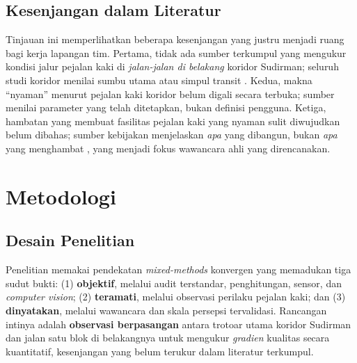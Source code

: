 \documentclass[11pt,a4paper]{report}
\begin{document}
\section{Kesenjangan dalam Literatur}
Tinjauan ini memperlihatkan beberapa kesenjangan yang justru menjadi ruang bagi kerja lapangan
tim. Pertama, tidak ada sumber terkumpul yang mengukur kondisi jalur pejalan kaki di
\emph{jalan-jalan di belakang} koridor Sudirman; seluruh studi koridor menilai sumbu utama atau
simpul transit \autocite{dwisadana2024,rakhmatulloh2020,ridhani2015,mulyadi2022}.
Kedua, makna ``nyaman'' menurut pejalan kaki koridor belum digali secara terbuka; sumber menilai
parameter yang telah ditetapkan, bukan definisi pengguna.
Ketiga, hambatan yang membuat fasilitas pejalan kaki yang nyaman sulit diwujudkan belum dibahas;
sumber kebijakan menjelaskan \emph{apa} yang dibangun, bukan \emph{apa} yang menghambat
\autocite{beritajakarta2019,itdp2019}, yang menjadi fokus wawancara ahli yang direncanakan.

\chapter{Metodologi}             %

\section{Desain Penelitian}
Penelitian memakai pendekatan \emph{mixed-methods} konvergen yang memadukan tiga sudut bukti:
(1) \textbf{objektif}, melalui audit terstandar, penghitungan, sensor, dan \emph{computer vision};
(2) \textbf{teramati}, melalui observasi perilaku pejalan kaki; dan (3) \textbf{dinyatakan},
melalui wawancara dan skala persepsi tervalidasi. Rancangan intinya adalah \textbf{observasi
berpasangan} antara trotoar utama koridor Sudirman dan jalan satu blok di belakangnya untuk
mengukur \emph{gradien} kualitas secara kuantitatif, kesenjangan yang belum terukur dalam
literatur terkumpul.
\end{document}
